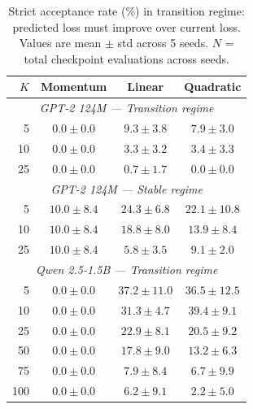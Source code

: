 \documentclass{article}
\begin{document}
\begin{table}[h]
\centering
\caption{Strict acceptance rate (\%) in transition regime: predicted loss must improve over current loss.
Values are mean $\pm$ std across 5 seeds.
$N$ = total checkpoint evaluations across seeds.
}
\label{tab:strict}
\begin{tabular}{r|ccc}
\toprule
$K$ & Momentum & Linear & Quadratic \\
\midrule
\multicolumn{4}{c}{\textit{GPT-2 124M --- Transition regime}} \\
\midrule
5   & $0.0 \pm 0.0$ & $9.3 \pm 3.8$  & $7.9 \pm 3.0$  \\
10  & $0.0 \pm 0.0$ & $3.3 \pm 3.2$  & $3.4 \pm 3.3$  \\
25  & $0.0 \pm 0.0$ & $0.7 \pm 1.7$  & $0.0 \pm 0.0$  \\
\midrule
\multicolumn{4}{c}{\textit{GPT-2 124M --- Stable regime}} \\
\midrule
5   & $10.0 \pm 8.4$ & $24.3 \pm 6.8$ & $22.1 \pm 10.8$ \\
10  & $10.0 \pm 8.4$ & $18.8 \pm 8.0$ & $13.9 \pm 8.4$  \\
25  & $10.0 \pm 8.4$ & $5.8 \pm 3.5$  & $9.1 \pm 2.0$   \\
\midrule
\multicolumn{4}{c}{\textit{Qwen 2.5-1.5B --- Transition regime}} \\
\midrule
5   & $0.0 \pm 0.0$ & $37.2 \pm 11.0$ & $36.5 \pm 12.5$ \\
10  & $0.0 \pm 0.0$ & $31.3 \pm 4.7$  & $39.4 \pm 9.1$  \\
25  & $0.0 \pm 0.0$ & $22.9 \pm 8.1$  & $20.5 \pm 9.2$  \\
50  & $0.0 \pm 0.0$ & $17.8 \pm 9.0$  & $13.2 \pm 6.3$  \\
75  & $0.0 \pm 0.0$ & $7.9 \pm 8.4$   & $6.7 \pm 9.9$   \\
100 & $0.0 \pm 0.0$ & $6.2 \pm 9.1$   & $2.2 \pm 5.0$   \\
\bottomrule
\end{tabular}
\end{table}
\end{document}

